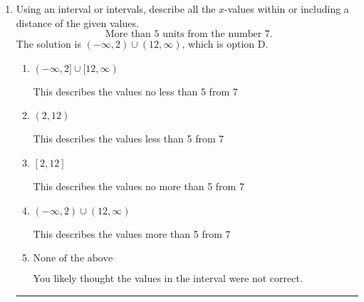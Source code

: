 \documentclass{extbook}[14pt]
\newcommand{\litem}[1]{\item #1

\rule{\textwidth}{0.4pt}}
\begin{document}
\begin{enumerate}
{\begin{enumerate}[label=\Alph*.]
 $[0.133, \infty)$, which corresponds to switching the direction of the interval. You likely did this if you did not flip the inequality when dividing by a negative!
\item \( (-\infty, a], \text{ where } a \in [-0.4, -0.03] \)

 $(-\infty, -0.133]$, which corresponds to negating the endpoint of the solution.
\item \( (-\infty, a], \text{ where } a \in [0.02, 0.49] \)

* $(-\infty, 0.133]$, which is the correct option.
\item \( [a, \infty), \text{ where } a \in [-0.3, 0.11] \)

 $[-0.133, \infty)$, which corresponds to switching the direction of the interval AND negating the endpoint. You likely did this if you did not flip the inequality when dividing by a negative as well as not moving values over to a side properly.
\item \( \text{None of the above}. \)

You may have chosen this if you thought the inequality did not match the ends of the intervals.
\end{enumerate}

\textbf{General Comment:} Remember that less/greater than or equal to includes the endpoint, while less/greater do not. Also, remember that you need to flip the inequality when you multiply or divide by a negative.
}
\litem{
Using an interval or intervals, describe all the $x$-values within or including a distance of the given values.
\[ \text{ More than } 5 \text{ units from the number } 7. \]The solution is \( (-\infty, 2) \cup (12, \infty) \), which is option D.\begin{enumerate}[label=\Alph*.]
\item \( (-\infty, 2] \cup [12, \infty) \)

This describes the values no less than 5 from 7
\item \( (2, 12) \)

This describes the values less than 5 from 7
\item \( [2, 12] \)

This describes the values no more than 5 from 7
\item \( (-\infty, 2) \cup (12, \infty) \)

This describes the values more than 5 from 7
\item \( \text{None of the above} \)

You likely thought the values in the interval were not correct.
\end{enumerate}

}
\end{enumerate}
\end{document}
